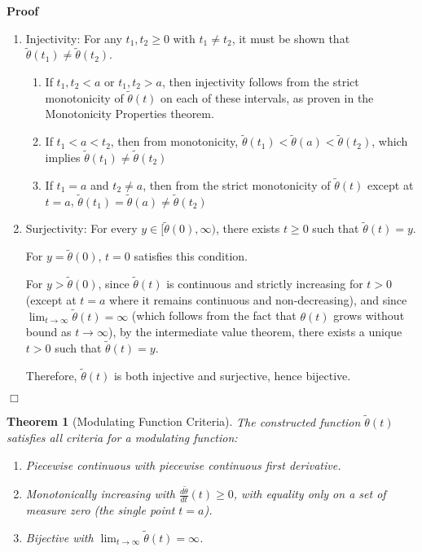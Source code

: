 \documentclass{article}
\newenvironment{proof}{\noindent\textbf{Proof\ }}{\hspace*{\fill}$\Box$\medskip}
\newtheorem{theorem}{Theorem}
\begin{document}
\begin{proof}
  
  \begin{enumerate}
    \item Injectivity: For any $t_1, t_2 \geq 0$ with $t_1 \neq t_2$, it must
    be shown that $\tilde{\theta} (t_1) \neq \tilde{\theta} (t_2)$.
    \begin{enumerate}
      \item If $t_1, t_2 < a$ or $t_1, t_2 > a$, then injectivity follows from
      the strict monotonicity of $\tilde{\theta} (t)$ on each of these
      intervals, as proven in the Monotonicity Properties theorem.
      
      \item If $t_1 < a < t_2$, then from monotonicity, $\tilde{\theta} (t_1)
      < \tilde{\theta} (a) < \tilde{\theta} (t_2)$, which implies
      $\tilde{\theta} (t_1) \neq \tilde{\theta} (t_2)$
      
      \item If $t_1 = a$ and $t_2 \neq a$, then from the strict monotonicity
      of $\tilde{\theta} (t)$ except at $t = a$, $\tilde{\theta} (t_1) =
      \tilde{\theta} (a) \neq \tilde{\theta} (t_2)$
    \end{enumerate}
    \item Surjectivity: For every $y \in [\tilde{\theta} (0), \infty)$, there
    exists $t \geq 0$ such that $\tilde{\theta} (t) = y$.
    
    For $y = \tilde{\theta} (0)$, $t = 0$ satisfies this condition.
    
    For $y > \tilde{\theta} (0)$, since $\tilde{\theta} (t)$ is continuous and
    strictly increasing for $t > 0$ (except at $t = a$ where it remains
    continuous and non-decreasing), and since $\lim_{t \to \infty} 
    \tilde{\theta} (t) = \infty$ (which follows from the fact that $\theta
    (t)$ grows without bound as $t \to \infty$), by the intermediate value
    theorem, there exists a unique $t > 0$ such that $\tilde{\theta} (t) = y$.
    
    Therefore, $\tilde{\theta} (t)$ is both injective and surjective, hence
    bijective.
  \end{enumerate}
\end{proof}

\begin{theorem}[Modulating Function Criteria]
  The constructed function $\tilde{\theta} (t)$ satisfies all criteria for a
  modulating function:
  \begin{enumerate}
    \item Piecewise continuous with piecewise continuous first derivative.
    
    \item Monotonically increasing with $\frac{d \tilde{\theta}}{dt} (t) \geq
    0$, with equality only on a set of measure zero (the single point $t =
    a$).
    
    \item Bijective with $\lim_{t \to \infty}  \tilde{\theta} (t) = \infty$.
  \end{enumerate}
\end{theorem}
\end{document}
